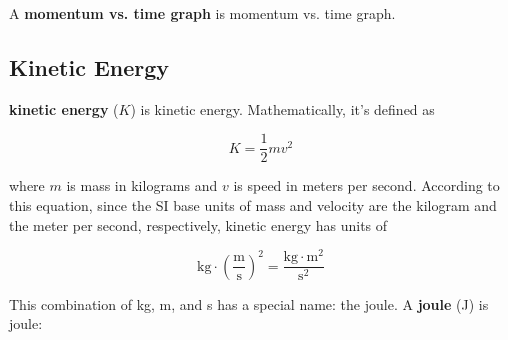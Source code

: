 \documentclass[dvipsnames]{article}
\begin{document}
A \textbf{\gls{momentum vs. time graph}} is \glsdesc{momentum vs. time graph}.

\begin{center}
\end{center}

\subsection{Kinetic Energy}





\textbf{\Gls{kinetic energy}} ($K$) is \glsdesc{kinetic energy}. Mathematically, it's defined as

\begin{equation*}
    K = \frac{1}{2} m v^2
\end{equation*}

where $m$ is mass in kilograms and $v$ is speed in meters per second. According to this equation, since the SI base units of mass and velocity are the kilogram and the meter per second, respectively, kinetic energy has units of

\begin{equation*}
    \mathrm{kg} \cdot \left(\mathrm{\frac{m}{s}}\right)^2 = \mathrm{\frac{kg\cdot m^2}{s^2}}
\end{equation*}

This combination of kg, m, and s has a special name: the joule. A \textbf{\gls{joule}} (J) is \glsdesc{joule}:
\end{document}
